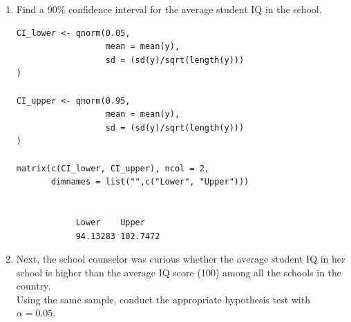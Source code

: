 \documentclass[12pt,letterpaper]{article}
\begin{document}
\begin{enumerate}
	\item Find a 90\% confidence interval for the average student IQ in the school.\\
\begin{verbatim}
CI_lower <- qnorm(0.05, 
                  mean = mean(y), 
                  sd = (sd(y)/sqrt(length(y))) 
)

CI_upper <- qnorm(0.95,
                  mean = mean(y),
                  sd = (sd(y)/sqrt(length(y)))
)

matrix(c(CI_lower, CI_upper), ncol = 2,
       dimnames = list("",c("Lower", "Upper")))


			Lower    Upper
			94.13283 102.7472 
		\end{verbatim}
		\vspace{.5cm}

\vspace{1cm}
	\item Next, the school counselor was curious  whether  the average student IQ in her school is higher than the average IQ score (100) among all the schools in the country.\\ 
	
	\noindent Using the same sample, conduct the appropriate hypothesis test with $\alpha=0.05$.
\end{enumerate}
\end{document}
